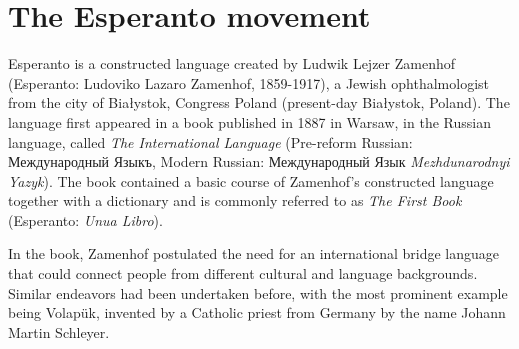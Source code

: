 \section{The Esperanto movement}

Esperanto is a constructed language created by Ludwik Lejzer Zamenhof (Esperanto: Ludoviko Lazaro Zamenhof, 1859-1917), a Jewish ophthalmologist from the city of Białystok, Congress Poland (present-day Białystok, Poland).
The language first appeared in a book published in 1887 in Warsaw, in the Russian language, called \textit{The International Language} (Pre-reform Russian: Международный Языкъ, Modern Russian: Международный Язык \textit{Mezhdunarodnyi Yazyk}).
The book contained a basic course of Zamenhof's constructed language together with a dictionary and is commonly referred to as \textit{The First Book} (Esperanto: \textit{Unua Libro}).

In the book, Zamenhof postulated the need for an international bridge language that could connect people from different cultural and language backgrounds.
Similar endeavors had been undertaken before, with the most prominent example being Volapük, invented by a Catholic priest from Germany by the name Johann Martin Schleyer. 
